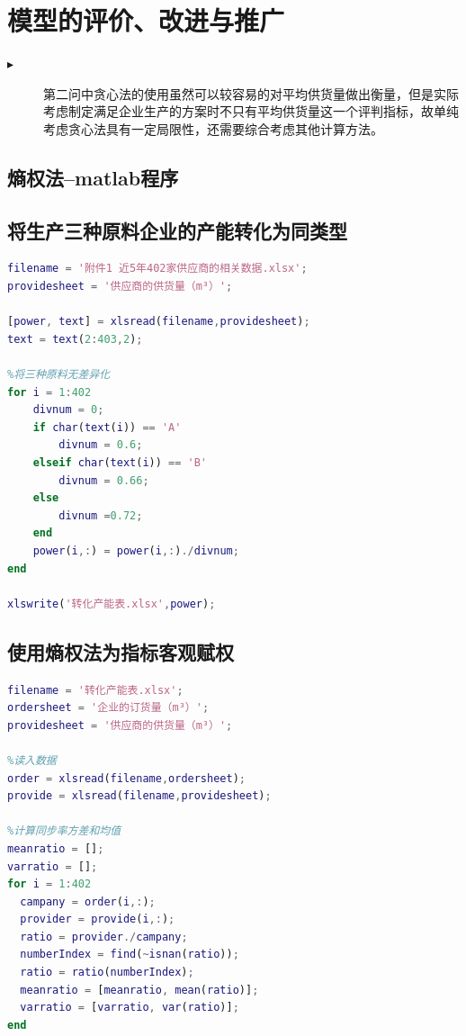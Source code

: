 \documentclass{cumcmthesis}
\begin{document}
\section{模型的评价、改进与推广}
\begin{description}
    \item[$\blacktriangleright$] 第二问中贪心法的使用虽然可以较容易的对平均供货量做出衡量，但是实际考虑制定满足企业生产的方案时不只有平均供货量这一个评判指标，故单纯考虑贪心法具有一定局限性，还需要综合考虑其他计算方法。
\end{description}



\newpage
\begin{appendices}
    \section{熵权法--matlab程序}
    \subsection{将生产三种原料企业的产能转化为同类型}
    \begin{lstlisting}[language=matlab]
filename = '附件1 近5年402家供应商的相关数据.xlsx';
providesheet = '供应商的供货量（m³）';

[power, text] = xlsread(filename,providesheet);
text = text(2:403,2);

%将三种原料无差异化
for i = 1:402
    divnum = 0;
    if char(text(i)) == 'A'
        divnum = 0.6;
    elseif char(text(i)) == 'B'
        divnum = 0.66;
    else
        divnum =0.72;
    end
    power(i,:) = power(i,:)./divnum;
end

xlswrite('转化产能表.xlsx',power);
\end{lstlisting}
    \subsection{使用熵权法为指标客观赋权}
    \begin{lstlisting}[language=matlab]
filename = '转化产能表.xlsx';
ordersheet = '企业的订货量（m³）';
providesheet = '供应商的供货量（m³）';

%读入数据
order = xlsread(filename,ordersheet);
provide = xlsread(filename,providesheet);

%计算同步率方差和均值
meanratio = [];
varratio = [];
for i = 1:402
  campany = order(i,:);
  provider = provide(i,:);
  ratio = provider./campany;
  numberIndex = find(~isnan(ratio));
  ratio = ratio(numberIndex);
  meanratio = [meanratio, mean(ratio)];
  varratio = [varratio, var(ratio)];
end


\end{lstlisting}
\end{appendices}
\end{document}
